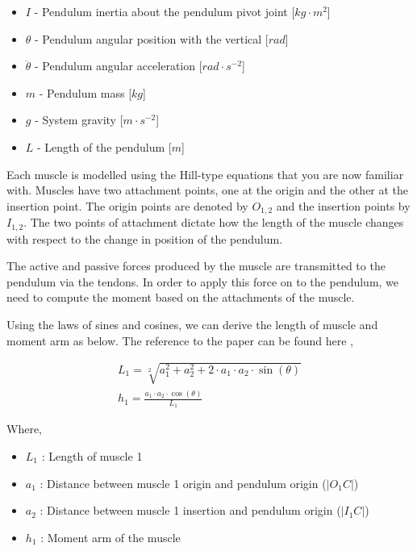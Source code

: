 \documentclass{cmc}
\begin{document}
\begin{itemize}
\item $I$ - Pendulum inertia about the pendulum pivot joint
  [$kg \cdot m^2$]
\item $\theta$ - Pendulum angular position with the vertical [$rad$]
\item $\ddot{\theta}$ - Pendulum angular acceleration
  [$rad \cdot s^{-2}$]
\item $m$ - Pendulum mass [$kg$]
\item $g$ - System gravity [$m \cdot s^{-2}$]
\item $L$ - Length of the pendulum [$m$]
\end{itemize}

Each muscle is modelled using the Hill-type equations that you are now
familiar with.  Muscles have two attachment points, one at the origin
and the other at the insertion point.  The origin points are denoted
by $O_{1,2}$ and the insertion points by $I_{1,2}$. The two points of
attachment dictate how the length of the muscle changes with respect
to the change in position of the pendulum.

The active and passive forces produced by the muscle are transmitted
to the pendulum via the tendons. In order to apply this force on to
the pendulum, we need to compute the moment based on the attachments
of the muscle.

Using the laws of sines and cosines, we can derive the length of
muscle and moment arm as below. The reference to the paper can be
found here
\href{https://www.ncbi.nlm.nih.gov/pmc/articles/PMC5323435}{},

\begin{eqnarray}
  \label{eq:2}
  L_1 = \sqrt[2]{a_{1}^2 + a_{2}^2 + 2 \cdot a_1 \cdot a_2 \cdot \sin(\theta)} \\
  h_1 = \frac{a_1 \cdot a_2 \cdot \cos(\theta)}{L_1}
\end{eqnarray}

Where,

\begin{itemize}
\item $L_1$ : Length of muscle 1
\item $a_1$ : Distance between muscle 1 origin and pendulum origin
  ($|O_1C|$)
\item $a_2$ : Distance between muscle 1 insertion and pendulum origin
  ($|I_1C|$)
\item $h_1$ : Moment arm of the muscle
\end{itemize}
\end{document}
